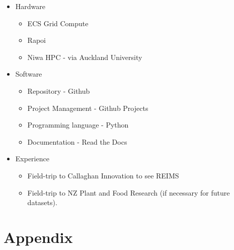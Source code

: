 \documentclass{article}
\begin{document}
\begin{itemize}
  \item Hardware 
  \begin{itemize}
    \item ECS Grid Compute 
    \item Rapoi 
    \item Niwa HPC - via Auckland University
  \end{itemize}
  \item Software 
  \begin{itemize}
    \item Repository - Github 
    \item Project Management - Github Projects 
    \item Programming language - Python
    \item Documentation - Read the Docs  
  \end{itemize}
  \item Experience 
  \begin{itemize}
    \item Field-trip to Callaghan Innovation to see REIMS 
    \item Field-trip to NZ Plant and Food Research (if necessary for future datasets). 
  \end{itemize}
\end{itemize}

\section{Appendix}
\label{sec:appendix}



\end{document}
